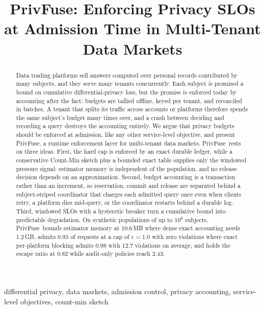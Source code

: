 \documentclass[conference]{IEEEtran}
\newcommand{\sys}{PrivFuse}
\newcommand{\eps}{\varepsilon}
\begin{document}
\title{\sys: Enforcing Privacy SLOs at Admission Time in Multi-Tenant Data Markets}

\author{
}

\maketitle

\begin{abstract}
Data trading platforms sell answers computed over personal records contributed
by many subjects, and they serve many tenants concurrently. Each subject is
promised a bound on cumulative differential-privacy loss, but the promise is
enforced today by accounting after the fact: budgets are tallied offline, keyed
per tenant, and reconciled in batches. A tenant that splits its traffic across
accounts or platforms therefore spends the same subject's budget many times
over, and a crash between deciding and recording a query destroys the
accounting entirely. We argue that privacy budgets should be enforced at
admission, like any other service-level objective, and present \sys, a runtime
enforcement layer for multi-tenant data markets. \sys\ rests on three ideas.
First, the hard cap is enforced by an exact durable ledger, while a conservative
Count-Min sketch plus a bounded exact table supplies only the windowed pressure
signal: estimator memory is independent of the population, and no release decision
depends on an approximation. Second, budget accounting is a transaction rather than an
increment, so reservation, commit and release are separated behind a
subject-striped coordinator that charges each admitted query once even when
clients retry, a platform dies mid-query, or the coordinator restarts behind a durable log. Third, windowed SLOs with a
hysteretic breaker turn a cumulative bound into predictable degradation. On
synthetic populations of up to $10^6$ subjects, \sys\ bounds estimator memory at
10.6\,MB where dense exact accounting needs 1.2\,GB, admits 0.93 of requests at a cap of
$\eps{=}1.0$ with zero violations where exact per-platform blocking admits 0.98 with 12.7
violations on average, and holds the escape ratio at 0.82 while audit-only policies reach
2.43.
\end{abstract}

\begin{IEEEkeywords}
differential privacy, data markets, admission control, privacy accounting,
service-level objectives, count-min sketch
\end{IEEEkeywords}




















\end{document}
